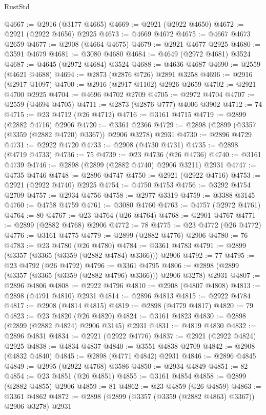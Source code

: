 \begin{lexlean}{RustStd}
\begin{coremodule}
@4667 := @2916 (@3177 @4665)
@4669 := @2921 (@2922 @4650)
@4672 := @2921 (@2922 @4656) @2925
@4673 := @4669 @4672
@4675 := @4667 @4673 @2659
@4677 := @2908 (@4664 @4675)
@4679 := @2921 @4677 @2925
@4680 := @3591 @4679
@4681 := @3080 @4680
@4684 := @4649 (@2972 @4681) @3524
@4687 := @4645 (@2972 @4684) @3524
@4688 := @4636 @4687
@4690 := @2559 (@4621 @4688)
@4694 := @2873 (@2876 @726) @2891 @3258
@4696 := @2916 (@2917 @1097)
@4700 := @2916 (@2917 @1102) @2926 @2659
@4702 := @2921 @4700 @2925
@4704 := @4696 @4702 @2709
@4705 := @2972 @4704
@4707 := @2559 (@4694 @4705)
@4711 := @2873 (@2876 @777) @4006 @3902
@4712 := 74
@4715 := @23 @4712 (@26 @4712)
@4716 := @3161 @4715
@4719 := @2899 (@2882 @4716) @2906
@4720 := @3361 @2366
@4729 := @2898 (@2899 (@3357 (@3359 (@2882 @4720) @3367)) @2906 @3278) @2931
@4730 := @2896 @4729
@4731 := @2922 @4720
@4733 := @2908 (@4730 @4731)
@4735 := @2898 (@4719 @4733)
@4736 := 75
@4739 := @23 @4736 (@26 @4736)
@4740 := @3161 @4739
@4746 := @2898 (@2899 (@2882 @4740) @2906 @3211) @2931
@4747 := @4735 @4746
@4748 := @2896 @4747
@4750 := @2921 (@2922 @4716)
@4753 := @2921 (@2922 @4740) @2925
@4754 := @4750 @4753
@4756 := @3292 @4754 @2709
@4757 := @2934 @4756
@4758 := @2977 @3319
@4759 := @3388 @3145
@4760 := @4758 @4759
@4761 := @3080 @4760
@4763 := @4757 (@2972 @4761)
@4764 := 80
@4767 := @23 @4764 (@26 @4764)
@4768 := @2901 @4767
@4771 := @2899 (@2882 @4768) @2906
@4772 := 78
@4775 := @23 @4772 (@26 @4772)
@4776 := @3161 @4775
@4779 := @2899 (@2882 @4776) @2906
@4780 := 76
@4783 := @23 @4780 (@26 @4780)
@4784 := @3361 @4783
@4791 := @2899 (@3357 (@3365 (@3359 (@2882 @4784) @3366))) @2906
@4792 := 77
@4795 := @23 @4792 (@26 @4792)
@4796 := @3361 @4795
@4806 := @2898 (@2899 (@3357 (@3365 (@3359 (@2882 @4796) @3366))) @2906 @3278) @2931
@4807 := @2896 @4806
@4808 := @2922 @4796
@4810 := @2908 (@4807 @4808)
@4813 := @2898 (@4791 @4810) @2931
@4814 := @2896 @4813
@4815 := @2922 @4784
@4817 := @2908 (@4814 @4815)
@4819 := @2898 (@4779 @4817)
@4820 := 79
@4823 := @23 @4820 (@26 @4820)
@4824 := @3161 @4823
@4830 := @2898 (@2899 (@2882 @4824) @2906 @3145) @2931
@4831 := @4819 @4830
@4832 := @2896 @4831
@4834 := @2921 (@2922 @4776)
@4837 := @2921 (@2922 @4824) @2925
@4838 := @4834 @4837
@4840 := @3551 @4838 @2709
@4842 := @2908 (@4832 @4840)
@4845 := @2898 (@4771 @4842) @2931
@4846 := @2896 @4845
@4849 := @2995 (@2922 @4768) @3586
@4850 := @2934 @4849
@4851 := 82
@4854 := @23 @4851 (@26 @4851)
@4855 := @3161 @4854
@4858 := @2899 (@2882 @4855) @2906
@4859 := 81
@4862 := @23 @4859 (@26 @4859)
@4863 := @3361 @4862
@4872 := @2898 (@2899 (@3357 (@3359 (@2882 @4863) @3367)) @2906 @3278) @2931

\end{coremodule}
\end{lexlean}
